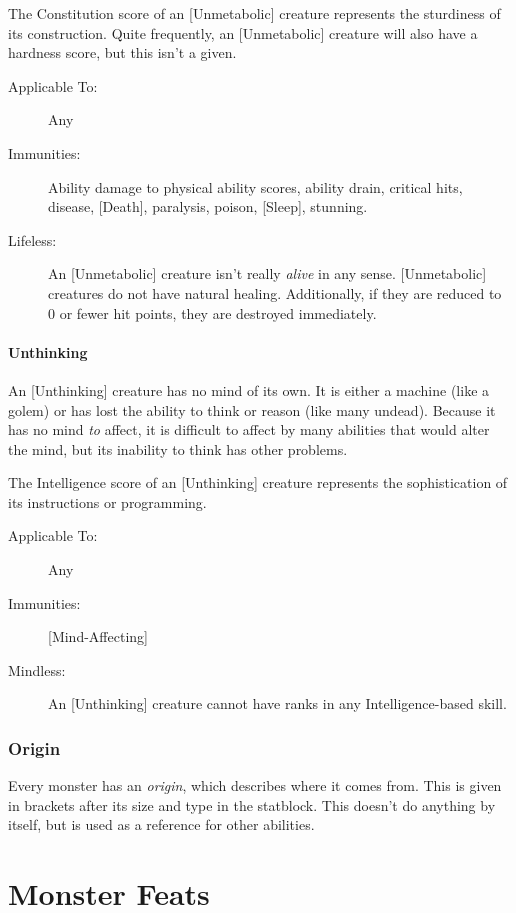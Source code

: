 \documentclass[10pt]{article}
\begin{document}
The Constitution score of an [Unmetabolic] creature represents the sturdiness of its construction. Quite frequently, an [Unmetabolic] creature will also have a hardness score, but this isn't a given.

\begin{description}
\item[Applicable To:] Any
\item[Immunities:] Ability damage to physical ability scores, ability drain, critical hits, disease, [Death], paralysis, poison, [Sleep], stunning.
\item[Lifeless:] An [Unmetabolic] creature isn't really {\em alive} in any sense. [Unmetabolic] creatures do not have natural healing. Additionally, if they are reduced to 0 or fewer hit points, they are destroyed immediately.
\end{description}

\subsection{Unthinking}

An [Unthinking] creature has no mind of its own. It is either a machine (like a golem) or has lost the ability to think or reason (like many undead). Because it has no mind {\em to} affect, it is difficult to affect by many abilities that would alter the mind, but its inability to think has other problems.

The Intelligence score of an [Unthinking] creature represents the sophistication of its instructions or programming.

\begin{description}
\item[Applicable To:] Any
\item[Immunities:] [Mind-Affecting]
\item[Mindless:] An [Unthinking] creature cannot have ranks in any Intelligence-based skill.
\end{description}

\section{Origin}

Every monster has an {\em origin}, which describes where it comes from. This is given in brackets after its size and type in the statblock. This doesn't do anything by itself, but is used as a reference for other abilities.

\pagebreak
\part{Monster Feats}
\end{document}
